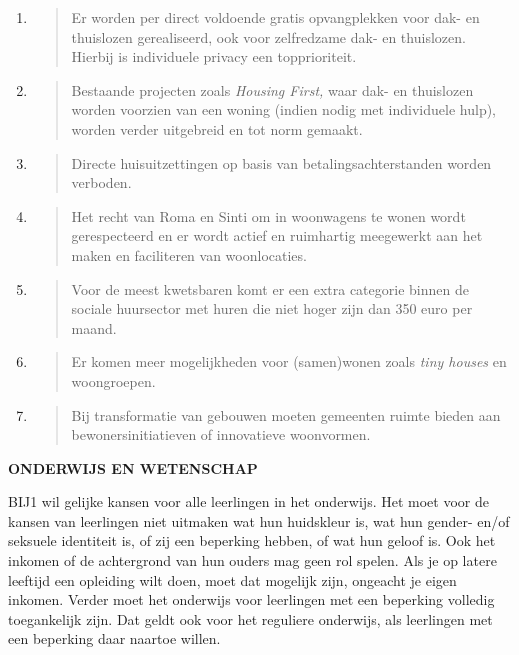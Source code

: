 \begin{enumerate}
\def\labelenumi{\arabic{enumi}.}
\item
  \begin{quote}
  Er worden per direct voldoende gratis opvangplekken voor dak- en
  thuislozen gerealiseerd, ook voor zelfredzame dak- en thuislozen.
  Hierbij is individuele privacy een topprioriteit.
  \end{quote}
\item
  \begin{quote}
  Bestaande projecten zoals \emph{Housing First,} waar dak- en
  thuislozen worden voorzien van een woning (indien nodig met
  individuele hulp), worden verder uitgebreid en tot norm gemaakt.
  \end{quote}
\item
  \begin{quote}
  Directe huisuitzettingen op basis van betalingsachterstanden worden
  verboden.
  \end{quote}
\item
  \begin{quote}
  Het recht van Roma en Sinti om in woonwagens te wonen wordt
  gerespecteerd en er wordt actief en ruimhartig meegewerkt aan het
  maken en faciliteren van woonlocaties.
  \end{quote}
\item
  \begin{quote}
  Voor de meest kwetsbaren komt er een extra categorie binnen de sociale
  huursector met huren die niet hoger zijn dan 350 euro per maand.
  \end{quote}
\item
  \begin{quote}
  Er komen meer mogelijkheden voor (samen)wonen zoals \emph{tiny houses}
  en woongroepen.
  \end{quote}
\item
  \begin{quote}
  Bij transformatie van gebouwen moeten gemeenten ruimte bieden aan
  bewonersinitiatieven of innovatieve woonvormen.
  \end{quote}
\end{enumerate}

\textbf{ONDERWIJS EN WETENSCHAP}

BIJ1 wil gelijke kansen voor alle leerlingen in het onderwijs. Het moet
voor de kansen van leerlingen niet uitmaken wat hun huidskleur is, wat
hun gender- en/of seksuele identiteit is, of zij een beperking hebben,
of wat hun geloof is. Ook het inkomen of de achtergrond van hun ouders
mag geen rol spelen. Als je op latere leeftijd een opleiding wilt doen,
moet dat mogelijk zijn, ongeacht je eigen inkomen. Verder moet het
onderwijs voor leerlingen met een beperking volledig toegankelijk zijn.
Dat geldt ook voor het reguliere onderwijs, als leerlingen met een
beperking daar naartoe willen.

